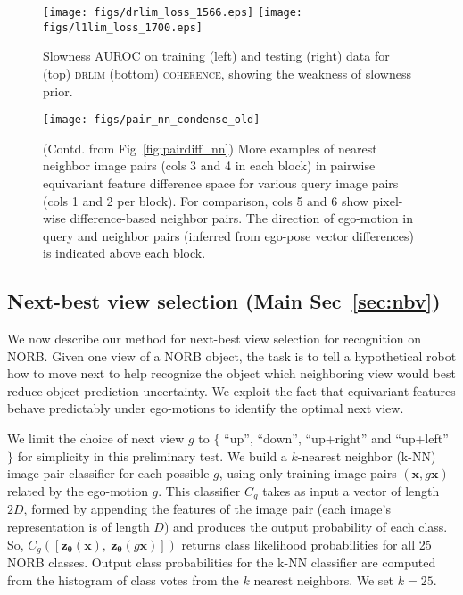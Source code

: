 \documentclass[10pt,twocolumn,letterpaper]{article}
\begin{document}
\begin{figure}[t]
  \centering
  \texttt{[image: figs/drlim\_loss\_1566.eps]}
  \texttt{[image: figs/l1lim\_loss\_1700.eps]}
  \caption{Slowness AUROC on training (left) and testing (right) data for (top) \textsc{drlim} (bottom) \textsc{coherence}, showing the weakness of slowness prior.}
  \label{fig:slowness_AUROC}
\end{figure}\begin{figure*}[ht]
  \centering
  \texttt{[image: figs/pair\_nn\_condense\_old]}
  \caption{ (Contd. from Fig~\ref{fig:pairdiff_nn}) More examples of nearest neighbor image pairs (cols 3 and 4 in each block) in pairwise equivariant feature difference space for various query image pairs (cols 1 and 2 per block). For comparison, cols 5 and 6 show pixel-wise difference-based neighbor pairs. The direction of ego-motion in query and neighbor pairs (inferred from ego-pose vector differences) is indicated above each block.}
  \label{fig:pair_nn_cases}
\end{figure*}\subsection{Next-best view selection (Main Sec~\ref{sec:nbv})}
We now describe our method for next-best view selection for recognition on NORB. Given one view of a NORB object, the task is to tell a hypothetical robot how to move next to help recognize the object \ie which neighboring view would best reduce object prediction uncertainty. We exploit the fact that equivariant features behave predictably under ego-motions to identify the optimal next view.

We limit the choice of next view $g$ to $\{$ ``up'', ``down'', ``up+right'' and ``up+left'' $\}$ for simplicity in this preliminary test. We build a $k$-nearest neighbor (k-NN) image-pair classifier for each possible $g$, using only training image pairs $(\bm{x},g\bm{x})$ related by the ego-motion $g$. This classifier $C_g$ takes as input a vector of length $2D$, formed by appending the features of the image pair (each image's representation is of length $D$) and produces the output probability of each class. So, $C_g([\mathbf{z}_{\bm{\theta}}(\bm{x}),~  \mathbf{z}_{\bm{\theta}}(g\bm{x})])$ returns class likelihood probabilities for all 25 NORB classes. Output class probabilities for the k-NN classifier are computed from the histogram of class votes from the $k$ nearest neighbors. We set $k=25$.
\end{document}
